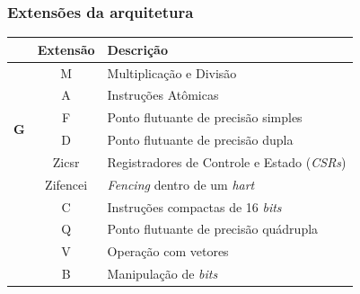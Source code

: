 \documentclass[aspectratio=169]{beamer}
\begin{document}
    \begin{frame}
        \frametitle{Extensões da arquitetura}
        \begin{longtable}{cc|l|}
            \cline{2-3}
                                                                & \multicolumn{1}{|c|}{Extensão}   & Descrição \\
            \hline
            \endhead
            \multicolumn{1}{|c}{\multirow{6}{*}{\textbf{G}}}    & \multicolumn{1}{|c|}{M}         & Multiplicação e Divisão  \\
            \cline{2-3}
            \multicolumn{1}{|c}{ }                              & \multicolumn{1}{|c|}{A}         & Instruções Atômicas  \\
            \cline{2-3}
            \multicolumn{1}{|c}{ }                              & \multicolumn{1}{|c|}{F}         & Ponto flutuante de precisão simples  \\
            \cline{2-3}
            \multicolumn{1}{|c}{ }                              & \multicolumn{1}{|c|}{D}         & Ponto flutuante de precisão dupla  \\
            \cline{2-3}
            \multicolumn{1}{|c}{ }                              & \multicolumn{1}{|c|}{Zicsr}     & Registradores de Controle e Estado (\textit{CSRs})  \\
            \cline{2-3}
            \multicolumn{1}{|c}{ }                              & \multicolumn{1}{|c|}{Zifencei}  & \textit{Fencing} dentro de um \textit{hart}   \\
            \hline
            \multicolumn{1}{c}{ }                               & \multicolumn{1}{|c|}{C}         & Instruções compactas de 16 \textit{bits} \\
            \cline{2-3}
            \multicolumn{1}{c}{ }                               & \multicolumn{1}{|c|}{Q}         & Ponto flutuante de precisão quádrupla  \\
            \cline{2-3}
            \multicolumn{1}{c}{ }                               & \multicolumn{1}{|c|}{V}         & Operação com vetores  \\
            \cline{2-3}
            \multicolumn{1}{c}{ }                               & \multicolumn{1}{|c|}{B}         & Manipulação de \textit{bits}  \\
            \cline{2-3}
        \end{longtable}
    \end{frame}
\end{document}
